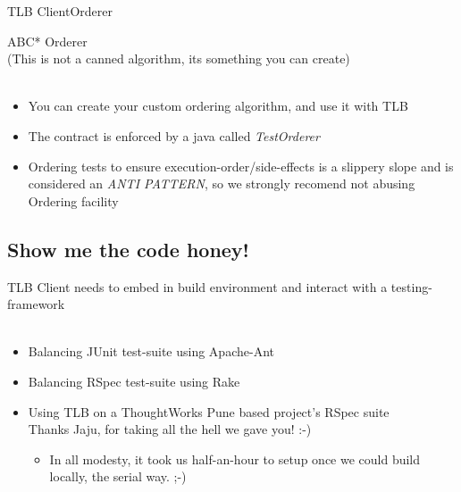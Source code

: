 \documentclass{beamer}
\begin{document}
\begin{frame}{TLB Client}{Orderer}
  \begin{center}
    {\large *ABC* Orderer}\\
    {\tiny (This is not a canned algorithm, its something you can create)}\\
    \quad\\
    \begin{itemize}
    \item You can create your custom ordering algorithm, and use it with TLB
    \item The contract is enforced by a java  called \emph{TestOrderer}
    \item Ordering tests to ensure execution-order/side-effects is a slippery slope and is considered an \emph{ANTI PATTERN}, so we strongly recomend not abusing Ordering facility
    \end{itemize}
  \end{center}
\end{frame}

\subsection{Show me the code honey!}

\begin{frame}
  \begin{centering}
    {\small TLB Client needs to embed in build environment and interact with a testing-framework}
    \quad\\
    \quad\\
    \pause
    \begin{itemize}
    \item Balancing JUnit test-suite using Apache-Ant
      \pause
    \item Balancing RSpec test-suite using Rake
    \pause
   \item Using TLB on a ThoughtWorks Pune based project's RSpec suite \\
     {\small Thanks Jaju, for taking all the hell we gave you! :-)}
     \begin{itemize}
     \item {\small In all modesty, it took us half-an-hour to setup once we could build locally, the serial way. ;-)}
     \end{itemize}
    \end{itemize}
  \end{centering}
\end{frame}
\end{document}
